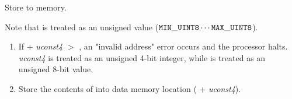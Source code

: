 


Store  to memory.

Note that  is treated as an unsigned value
		(${\bf\tt MIN\_UINT8} \cdots {\bf\tt MAX\_UINT8}$).

\begin{enumerate}

\item If  + {\em uconst4} $>$ \MaxUIntWord,
	an "invalid address" error occurs and the processor halts.
	{\em uconst4} is treated
	as an unsigned 4-bit integer, while  is treated as
	an unsigned 8-bit value.

\item Store the contents of  into data memory location
	( + {\em uconst4}).

\end{enumerate}

